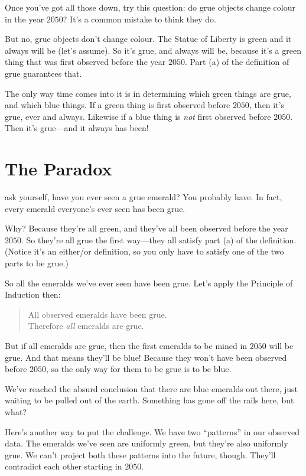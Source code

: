 \documentclass[justified]{tufte-book}
\newenvironment{argument}{\begin{quote}\normalsize}{\end{quote}}
\begin{document}
Once you've got all those down, try this question: do grue objects change colour in the year \(2050\)? It's a common mistake to think they do.

But no, grue objects don't change colour. The Statue of Liberty is green and it always will be (let's assume). So it's grue, and always will be, because it's a green thing that was first observed before the year \(2050\). Part (a) of the definition of grue guarantees that.

The only way time comes into it is in determining which green things are grue, and which blue things. If a green thing is first observed before \(2050\), then it's grue, ever and always. Likewise if a blue thing is \emph{not} first observed before \(2050\). Then it's grue---and it always has been!

\hypertarget{the-paradox}{%
\section*{The Paradox}\label{the-paradox}}

 ask yourself, have you ever seen a grue emerald? You probably have. In fact, every emerald everyone's ever seen has been grue.

Why? Because they're all green, and they've all been observed before the year \(2050\). So they're all grue the first way---they all satisfy part (a) of the definition. (Notice it's an either/or definition, so you only have to satisfy one of the two parts to be grue.)

So all the emeralds we've ever seen have been grue. Let's apply the Principle of Induction then:

\begin{argument}
All observed emeralds have been grue.\\
Therefore \emph{all} emeralds are grue.
\end{argument}

But if all emeralds are grue, then the first emeralds to be mined in \(2050\) will be grue. And that means they'll be blue! Because they won't have been observed before \(2050\), so the only way for them to be grue is to be blue.

We've reached the absurd conclusion that there are blue emeralds out there, just waiting to be pulled out of the earth. Something has gone off the rails here, but what?

Here's another way to put the challenge. We have two ``patterns'' in our observed data. The emeralds we've seen are uniformly green, but they're also uniformly grue. We can't project both these patterns into the future, though. They'll contradict each other starting in \(2050\).
\end{document}
